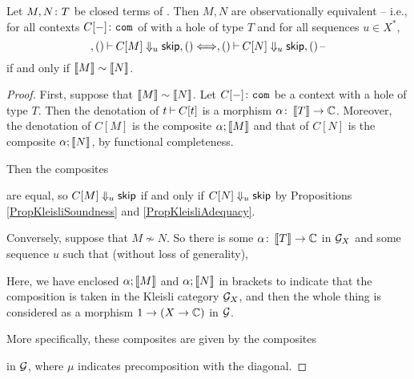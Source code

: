 \documentclass{article}
\begin{document}
\begin{theorem}
  Let $M,N\colon T$ be closed terms of \IAX.  
  Then $M,N$ are observationally equivalent -- i.e., for all contexts $C[-]\colon{\mathtt{com}}$ of \IAX with a hole of type $T$ and for all sequences $u\in X^*$, 
  \[
    ,()\mathbin{\vdash} C[M] \Downarrow_u {\mathsf{skip}},() \Longleftrightarrow ,()\mathbin{\vdash} C[N] \Downarrow_u {\mathsf{skip}},()\,\text{--}
    \]
  if and only if $\left\llbracket M\right\rrbracket\sim\left\llbracket N\right\rrbracket$.
  \label{TheKleisliFullAbstraction}
\end{theorem}
\begin{proof}
  First, suppose that $\left\llbracket M\right\rrbracket\sim\left\llbracket N\right\rrbracket$.  
  Let $C[-]\colon{\mathtt{com}}$ be a context with a hole of type $T$.  
  Then the denotation of $t\mathbin{\vdash} C[t]$ is a morphism $\alpha\colon \left\llbracket T\right\rrbracket \to \mathbb{C}$.
  Moreover, the denotation of $C[M]$ is the composite $\alpha;\left\llbracket M\right\rrbracket$ and that of $C[N]$ is the composite $\alpha;\left\llbracket N\right\rrbracket$, by functional completeness.

  Then the composites
  are equal, so $C[M]\Downarrow_u{\mathsf{skip}}$ if and only if $C[N]\Downarrow_u{\mathsf{skip}}$ by Propositions \ref{PropKleisliSoundness} and \ref{PropKleisliAdequacy}.

  Conversely, suppose that $M\not\sim N$.  
  So there is some $\alpha\colon \left\llbracket T\right\rrbracket \to \mathbb{C}$ in $\mathcal G_X$ and some sequence $u$ such that (without loss of generality),
  Here, we have enclosed $\alpha;\left\llbracket M\right\rrbracket$ and $\alpha;\left\llbracket N\right\rrbracket$ in brackets to indicate that the composition is taken in the Kleisli category $\mathcal G_X$, and then the whole thing is considered as a morphism $1 \to (X \to \mathbb{C})$ in $\mathcal G$.

  More specifically, these composites are given by the composites
  in $\mathcal G$, where $\mu$ indicates precomposition with the diagonal.


\end{proof}
\end{document}
